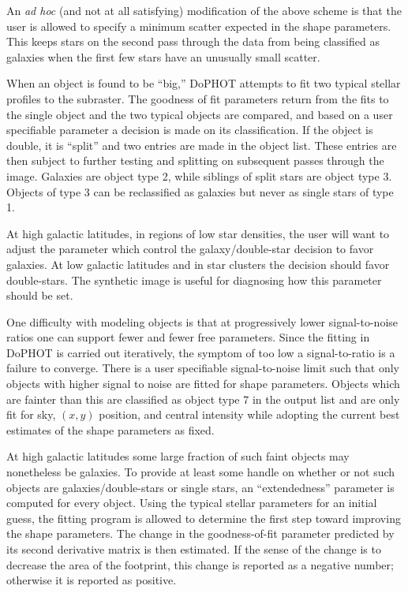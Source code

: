 An {\it ad hoc} (and not at all satisfying) modification of the
above scheme is that the user is allowed to specify a
minimum scatter expected in the shape parameters.  This
keeps stars on the second pass through the data from being
classified as galaxies when the first few stars have an
unusually small scatter.

When an object is found to be ``big,'' DoPHOT attempts to
fit two typical stellar profiles to the subraster.  The
goodness of fit parameters return from the fits to the
single object and the two typical objects are compared, and
based on a user specifiable parameter a decision is made on
its classification.  If the object is double, it is
``split'' and two entries are made in the object list.
These entries are then subject to further testing and
splitting on subsequent passes through the image.  Galaxies
are object type 2, while siblings of split stars are object
type 3.  Objects of type 3 can be reclassified as galaxies
but never as single stars of type 1.

At high galactic latitudes, in regions of low star
densities, the user will want to adjust the parameter
which control the galaxy/double-star decision to
favor galaxies.   At low galactic latitudes and
in star clusters the decision should favor double-stars.
The synthetic image is useful for diagnosing how this
parameter should be set.

One difficulty with modeling objects is that at
progressively lower signal-to-noise ratios one can support
fewer and fewer free parameters.  Since the fitting in
DoPHOT is carried out iteratively, the symptom of too low a
signal-to-ratio is a failure to converge.  There is a user
specifiable signal-to-noise limit such that only objects
with higher signal to noise are fitted for shape parameters.
Objects which are fainter than this are classified as object
type 7 in the output list and are only fit for sky, $(x,y)$ position,
and central intensity while adopting the current best estimates of
the shape parameters as fixed.

At high galactic latitudes some large fraction of such faint
objects may nonetheless be galaxies.  To provide at least
some handle on whether or not such objects are
galaxies/double-stars or single stars, an ``extendedness''
parameter is computed for every object.  Using the typical
stellar parameters for an initial guess, the fitting program
is allowed to determine the first step toward improving the
shape parameters.  The change in the goodness-of-fit parameter
predicted by its second derivative matrix is then estimated.
If the sense of the change is to decrease the area of the
footprint, this change is reported as a negative number;
otherwise it is reported as positive.  

